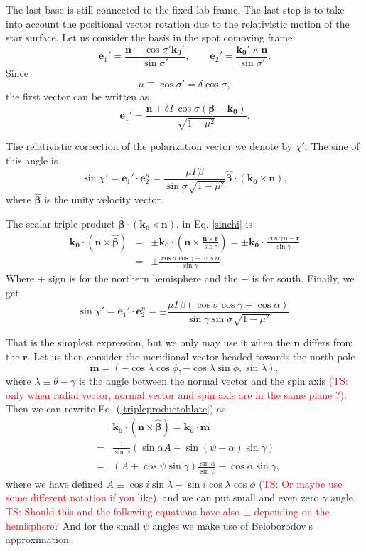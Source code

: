 \documentclass{aa}
\newcommand{\be}{\begin{equation}}
\newcommand{\ee}{\end{equation}}
\def\beq{\begin{eqnarray}}
\def\eeq{\end{eqnarray}}
\newcommand{\red}[1]{\textcolor{red}{#1}}
\begin{document}
The last base is still connected to the fixed lab frame. 
The last step is to take into account the positional vector rotation due to the relativistic motion of the star surface.
Let us consider the basis in the spot comoving frame
\be\label{primebasis}
\bm{e}_1' = \frac{\bm{n}-\cos{\sigma'} \bm{k_0'}}{\sin{\sigma'}},\qquad 
\bm{e}_2' = \frac{\bm{k_0'} \times \bm{n}}{\sin{\sigma'}} .
\ee
Since \be
\mu\equiv\cos\sigma'=\delta\cos{\sigma},
\ee
the first vector can be written as 
\be
\bm{e}_1' = \frac{\bm{n}+\delta\Gamma\cos{\sigma} (\bm{\beta-k_0})}{\sqrt{1-\mu^2 } }.
\ee

The relativistic correction of the polarization vector we denote by $\chi'$.
The sine of this angle is
\be\label{sinchi}
\sin{\chi'}=\bm{e}_1'\cdot \bm{e}_2^n =
\frac{\mu\Gamma\beta }{\sin{\sigma}\sqrt{1-\mu^2} } \bm{\hat\beta} \cdot(\bm{k_0} \times \bm{n}),
\ee
where $\bm{\hat\beta}$ is the unity velocity vector.
			
The scalar triple product $\bm{\hat\beta} \cdot(\bm{k_0} \times \bm{n}) $, in Eq. \eqref{sinchi} is
\beq\label{tripleproductoblate}
\bm{k_0} \cdot (\bm{n}\times\bm{\hat\beta} )&=&\pm
\bm{k_0} \cdot \left(\bm{n} \times \frac{\bm{n} \times \bm{r}}{\sin{\gamma}}\right)=\pm
\bm{k_0} \cdot \frac{\cos{\gamma}\bm{n} - \bm{r}}{\sin{\gamma}} \nonumber \\
&=& \pm \frac{\cos{\sigma}\cos{\gamma}-\cos{\alpha}}{\sin{\gamma}},
\eeq
Where $+$ sign is for the northern hemisphere and the $-$ is for south.
Finally, we get
\be\label{chiprime}
\sin{\chi'}=\bm{e}_1'\cdot \bm{e}_2^n =\pm
\frac{\mu\Gamma\beta (\cos{\sigma}\cos{\gamma}-\cos{\alpha})}{\sin{\gamma}\sin{\sigma}\sqrt{1-\mu^2} }.
\ee

That is the simplest expression, but we only may use it when the $\bm n$ differs from the $\bm r$. 
Let us then  consider the meridional vector headed towards the north pole
\be
\bm m = (- \cos \lambda \cos \phi, -\cos \lambda \sin \phi, \sin \lambda ),
\ee
where $\lambda \equiv \theta-\gamma$ is the angle between the normal vector and the spin axis \red{(TS: only when radial vector, normal vector and spin axis are in the same plane ?)}.
Then we can rewrite Eq. (\eqref{tripleproductoblate}) as
\beq\label{tripleproductpherical}
&& \bm{k_0} \cdot (\bm{n}\times\bm{\hat\beta} )=
\bm{k_0} \cdot \bm{m} \nonumber \\
&=& \frac1{\sin\psi}(\sin \alpha A - \sin(\psi-\alpha)\sin\gamma ) \nonumber	\\
&=& (A+\cos\psi \sin\gamma)\frac{\sin\alpha}{\sin\psi} - \cos \alpha\sin\gamma, 
\eeq
where we have defined $A \equiv \cos i \sin \lambda - \sin i \cos \lambda \cos \phi$ (\red{TS: Or maybe use some different notation if you like}), and we can put small and even zero $\gamma$ angle. \red{TS: Should this and the following equations have also $\pm$ depending on the hemisphere? }
And for the small 
$\psi$
angles we make use of Beloborodov's approximation.
\end{document}
